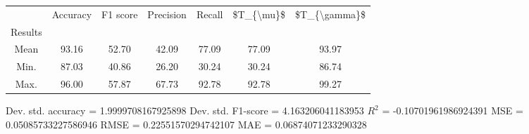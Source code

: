 \begin{tabular}{|c|c|c|c|c|c|c|}
\toprule
{} &  Accuracy &  F1 score &  Precision &  Recall &  \$T\_\{\textbackslash mu\}\$ &  \$T\_\{\textbackslash gamma\}\$ \\
Results &           &           &            &         &            &               \\
\hline
Mean    &     93.16 &     52.70 &      42.09 &   77.09 &      77.09 &         93.97 \\
Min.    &     87.03 &     40.86 &      26.20 &   30.24 &      30.24 &         86.74 \\
Max.    &     96.00 &     57.87 &      67.73 &   92.78 &      92.78 &         99.27 \\
\bottomrule
\end{tabular}

 Dev. std. accuracy = 1.9999708167925898
 Dev. std. F1-score = 4.163206041183953
 $R^2$ = -0.10701961986924391
 MSE = 0.05085733227586946
 RMSE = 0.22551570294742107
 MAE = 0.06874071233290328